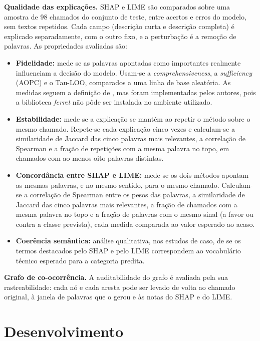 \documentclass[
    12pt,                %
    openright,           %
    oneside,             %
    a4paper,             %
    english,             %
    brazil               %
]{abntex2}
\begin{document}
\textbf{Qualidade das explicações.} SHAP e LIME são comparados sobre uma amostra de 98 chamados do conjunto de teste, entre acertos e erros do modelo, sem textos repetidos. Cada campo (descrição curta e descrição completa) é explicado separadamente, com o outro fixo, e a perturbação é a remoção de palavras. As propriedades avaliadas são:
\begin{itemize}
  \item \textbf{Fidelidade:} mede se as palavras apontadas como importantes realmente influenciam a decisão do modelo. Usam-se a \textit{comprehensiveness}, a \textit{sufficiency} (AOPC) e o Tau-LOO, comparados a uma linha de base aleatória. As medidas seguem a definição de , mas foram implementadas pelos autores, pois a biblioteca \textit{ferret} não pôde ser instalada no ambiente utilizado.
  \item \textbf{Estabilidade:} mede se a explicação se mantém ao repetir o método sobre o mesmo chamado. Repete-se cada explicação cinco vezes e calculam-se a similaridade de Jaccard das cinco palavras mais relevantes, a correlação de Spearman e a fração de repetições com a mesma palavra no topo, em chamados com ao menos oito palavras distintas.
  \item \textbf{Concordância entre SHAP e LIME:} mede se os dois métodos apontam as mesmas palavras, e no mesmo sentido, para o mesmo chamado. Calculam-se a correlação de Spearman entre os pesos das palavras, a similaridade de Jaccard das cinco palavras mais relevantes, a fração de chamados com a mesma palavra no topo e a fração de palavras com o mesmo sinal (a favor ou contra a classe prevista), cada medida comparada ao valor esperado ao acaso.
  \item \textbf{Coerência semântica:} análise qualitativa, nos estudos de caso, de se os termos destacados pelo SHAP e pelo LIME correspondem ao vocabulário técnico esperado para a categoria predita.
\end{itemize}

\textbf{Grafo de co-ocorrência.} A auditabilidade do grafo é avaliada pela sua rastreabilidade: cada nó e cada aresta pode ser levado de volta ao chamado original, à janela de palavras que o gerou e às notas do SHAP e do LIME. 

\chapter{Desenvolvimento}
\label{cap:desenvolvimento}
\end{document}
